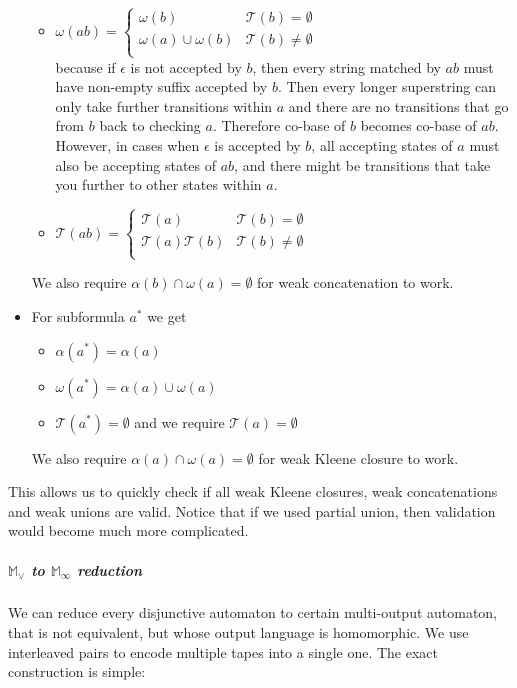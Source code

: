 \documentclass[12pt]{article}
\begin{document}
\begin{itemize}
\begin{itemize}
		\item $\omega(ab) = \begin{cases}
		\omega(b)  & \mathcal{T}(b)=\emptyset \\
		\omega(a) \cup \omega(b)  & \mathcal{T}(b) \ne \emptyset \\
		\end{cases}$ \\
		because if $\epsilon$ is not accepted by $b$, then every string matched by $ab$ must have non-empty suffix accepted by $b$. Then every longer superstring can only take further transitions within $a$ and there are no transitions that go from $b$ back to checking $a$. Therefore co-base of $b$ becomes co-base of $ab$. However, in cases when $\epsilon$ is accepted by $b$, all accepting states of $a$ must also be accepting states of $ab$, and there might be transitions that take you further to other states within $a$. 
		\item $\mathcal{T}(ab) = \begin{cases}
		\mathcal{T}(a)  & \mathcal{T}(b)=\emptyset \\
		\mathcal{T}(a)\mathcal{T}(b)  & \mathcal{T}(b) \ne \emptyset \\
		\end{cases} $ 
	\end{itemize} 
    We also require $\alpha(b)\cap\omega(a)=\emptyset$ for weak concatenation to work. 
	\item For subformula $a^*$ we get 
	\begin{itemize}
		\item $\alpha(a^*) = \alpha(a)$
		\item $\omega(a^*) =   \alpha(a) \cup \omega(a) $
		\item $\mathcal{T}(a^*) = \emptyset$ and we require $\mathcal{T}(a) = \emptyset$
	\end{itemize} 
    We also require $\alpha(a)\cap\omega(a)=\emptyset$ for weak Kleene closure to work.
\end{itemize}
This allows us to quickly check if all weak Kleene closures, weak concatenations and weak unions are valid. Notice that if we used partial union, then validation would become much more complicated.



\subparagraph{$\mathbb{ M}_\vee$ to $\mathbb{ M}_\infty$ reduction}
We can reduce every disjunctive automaton to certain multi-output automaton, that is not equivalent, but whose output language is homomorphic. We use interleaved pairs to encode multiple tapes into a single one. The exact construction is simple:
\end{document}
